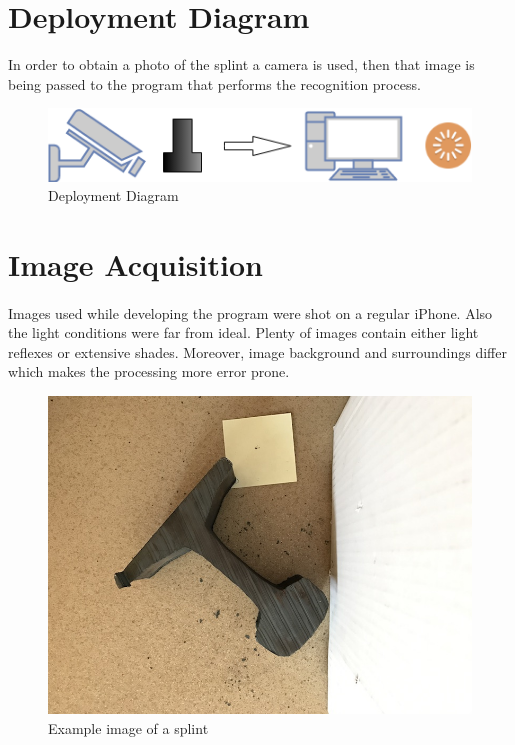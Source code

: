 \section{Deployment Diagram}
In order to obtain a photo of the splint a camera is used, then that image is being passed to the program that performs the recognition process.
\begin{figure}[h]
	\centering
	\includegraphics[width=\textwidth]{images/deployment_diagram}
	\caption{Deployment Diagram}
\end{figure}

\section{Image Acquisition}
\paragraph{}
Images used while developing the program were shot on a regular iPhone. Also the light conditions were far from ideal. Plenty of images contain either light reflexes or extensive shades. Moreover, image background and surroundings differ which makes the processing more error prone.

\begin{figure}
	\centering
	\includegraphics[width=\textwidth]{images/example_splint}
	\caption{Example image of a splint}
\end{figure}

